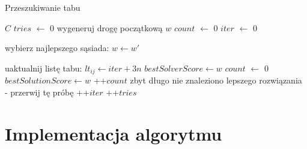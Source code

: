\documentclass[11pt,a4paper,twoside]{article}
\begin{document}
\begin{algorithm}[ht]
\caption{Przeszukiwanie tabu}
\label{tabuSearchAlg}
\begin{algorithmic}%
\Require $C$
	\State $tries$ $\leftarrow$ 0
		\State wygeneruj drogę początkową $w$
		\State $count$ $\leftarrow$ 0
		\State $iter$ $\leftarrow$ 0
		
		\State wybierz najlepszego sąsiada: $w \leftarrow w'$
		\EndIf
		\EndWhile
			
			
					
			\State uaktualnij listę tabu: $lt_{ij} \leftarrow iter + 3n$
				\State $bestSolverScore \leftarrow w$
				\State $count$ $\leftarrow$ 0
					\State $bestSolutionScore \leftarrow w$
    			\EndIf
    		\Else
    			\State ++$count$
    		\EndIf
    			\State zbyt długo nie znaleziono lepszego rozwiązania - przerwij tę próbę
    		\EndIf
    	\State ++$iter$
		\EndWhile
		\State ++$tries$
	\EndWhile
\end{algorithmic}
\end{algorithm}



\section{Implementacja algorytmu}
\end{document}
